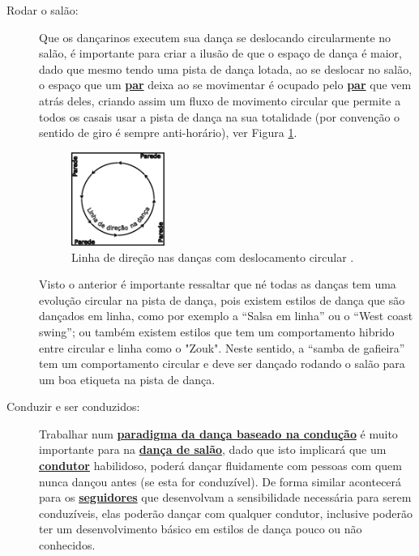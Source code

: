 \begin{description}

\item[Rodar o salão:] Que os dançarinos executem sua dança se deslocando circularmente no salão, 
é importante para criar a ilusão de que o espaço de dança é maior, dado que mesmo
tendo uma pista de dança lotada, ao se deslocar no salão, o espaço que um
\hyperref[def:Par]{\textbf{par}} deixa ao se movimentar é ocupado pelo \hyperref[def:Par]{\textbf{par}} que vem atrás deles, criando 
assim um fluxo de movimento circular que permite a todos os casais usar a pista de dança
na sua totalidade (por convenção o sentido de giro é sempre anti-horário), ver Figura \ref{fig:giro-antihorario1}.
\begin{figure}[h]
  \centering
    \includegraphics[width=0.3\textwidth]{chapters/cap-normas/circular-antihorario.eps}
\caption{Linha de direção nas danças com  deslocamento circular \cite[pp. 20]{freitas1959danca}.}
\label{fig:giro-antihorario1}
\end{figure}
Visto o anterior é importante ressaltar que né todas as danças tem
uma evolução circular na pista de dança, pois existem estilos de dança que são dançados em linha,
como por exemplo a ``Salsa em linha'' ou o ``West coast swing''; ou também existem estilos que
tem um comportamento hibrido entre circular e linha como o "Zouk". Neste sentido,
a ``samba de gafieira'' tem um comportamento circular e  deve ser dançado
rodando o salão para um boa etiqueta na pista de dança.


\item[Conduzir e ser conduzidos:] Trabalhar num \hyperref[def:ParadigmaConducao]{\textbf{paradigma da dança baseado
na condução}} é muito importante para na \hyperref[def:DancaSalao]{\textbf{dança de salão}}, dado que isto implicará
que um \hyperref[def:Condutor]{\textbf{condutor}} habilidoso, poderá dançar fluidamente com pessoas com quem nunca dançou
antes (se esta for conduzível). De forma similar acontecerá para os \hyperref[def:Seguidor]{\textbf{seguidores}} que desenvolvam
a sensibilidade necessária para serem conduzíveis, elas poderão dançar com qualquer
condutor, inclusive poderão ter um desenvolvimento básico em estilos de dança pouco ou não conhecidos.


\end{description}

